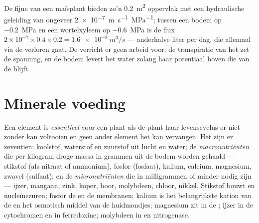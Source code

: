 \begin{example}\label{ex:b1:plant-water-minerals:litre}
De fijne  van een maïsplant bieden zo'n \qty{0.2}{m^2} oppervlak met
een hydraulische geleiding van ongeveer \qty{2e-7}{m.s^{-1}.MPa^{-1}};
tussen een bodem op \qty{-0.2}{MPa} en een wortelxyleem op \qty{-0.6}{MPa}
is de flux $2\times 10^{-7}\times 0.4\times 0.2 = \qty{1.6e-8}{m^3/s}$ ---
anderhalve liter per dag, die allemaal via de  verloren gaat. De
 verricht er geen arbeid voor: de transpiratie van het  zet de
spanning, en de bodem levert het water zolang haar potentiaal boven die van
de  blijft.
\end{example}

\section{Minerale voeding}

\begin{definition}\label{def:b1:plant-water-minerals:elements}
Een element is \emph{essentieel} voor een plant als de plant haar
levenscyclus er niet zonder kan voltooien en geen ander element het kan
vervangen. Het zijn er zeventien: koolstof, waterstof en zuurstof uit lucht
en water; de \emph{macronutriënten} die per kilogram droge massa in grammen
uit de bodem worden gehaald --- stikstof (als nitraat of ammonium), fosfor
(fosfaat), kalium, calcium, magnesium, zwavel (sulfaat); en de
\emph{micronutriënten} die in milligrammen of minder nodig zijn --- ijzer,
mangaan, zink, koper, boor, molybdeen, chloor, nikkel. Stikstof bouwt
 en nucleïnezuren; fosfor de  en de membranen; kalium is
het belangrijkste kation van de  en het osmotisch middel van de
huidmondjes; magnesium zit in de ; ijzer in de cytochromen en in
ferredoxine; molybdeen in  en nitrogenase.
\end{definition}

